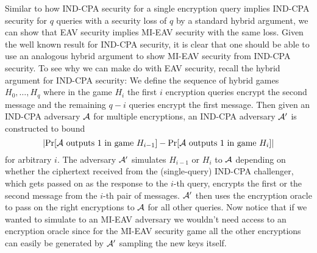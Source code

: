 Similar to how IND-CPA security for a single encryption query implies IND-CPA security for $q$ queries with a security loss of $q$ by a standard hybrid argument, we can show that EAV security implies MI-EAV security with the same loss. Given the well known result for IND-CPA security, it is clear that one should be able to use an analogous hybrid argument to show MI-EAV security from IND-CPA security. To see why we can make do with EAV security, recall the hybrid argument for IND-CPA security: We define the sequence of hybrid games $H_0, \ldots, H_q$ where in the game $H_i$ the first $i$ encryption queries encrypt the second message and the remaining $q - i$ queries encrypt the first message. Then given an IND-CPA adversary $\mathcal{A}$ for multiple encryptions, an IND-CPA adversary $\mathcal{A}'$ is constructed to bound
\[
	\abs*{\pr{\adv \text{ outputs } 1 \text{ in game } H_{i - 1}} - \pr{\adv \text{ outputs } 1 \text{ in game } H_{i}}}
\]
for arbitrary $i$.
The adversary $\mathcal{A}'$ simulates $H_{i - 1}$ or $H_{i}$ to $\mathcal{A}$ depending on whether the ciphertext received from the (single-query) IND-CPA challenger, which gets passed on as the response to the $i$-th query, encrypts the first or the second message from the $i$-th pair of messages. $\mathcal{A}'$ then uses the encryption oracle to pass on the right encryptions to $\mathcal{A}$ for all other queries. Now notice that if we wanted to simulate to an MI-EAV adversary we wouldn't need access to an encryption oracle since for the MI-EAV security game all the other encryptions can easily be generated by $\mathcal{A}'$ sampling the new keys itself.

